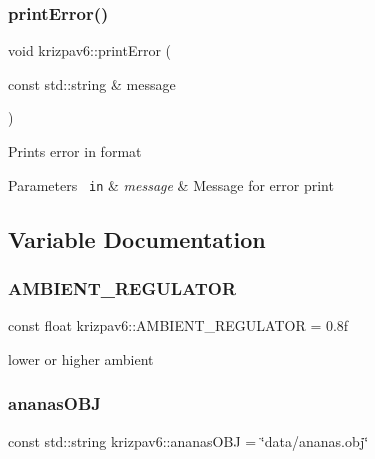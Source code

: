 \mbox{\label{namespacekrizpav6_a90d5cfc723ed2f9805870e7a0b6587cf}} 
\subsubsection{\texorpdfstring{printError()}{printError()}}
{\footnotesize\ttfamily void krizpav6\+::print\+Error (\begin{DoxyParamCaption}\item[{const std\+::string \&}]{message }\end{DoxyParamCaption})}

Prints error in format 
\begin{DoxyParams}[1]{Parameters}
\mbox{\texttt{ in}}  & {\em message} & Message for error print \\
\hline
\end{DoxyParams}


\subsection{Variable Documentation}
\mbox{\label{namespacekrizpav6_afb15791f5e8e6465d001c4f31b465bb5}} 
\subsubsection{\texorpdfstring{AMBIENT\_REGULATOR}{AMBIENT\_REGULATOR}}
{\footnotesize\ttfamily const float krizpav6\+::\+A\+M\+B\+I\+E\+N\+T\+\_\+\+R\+E\+G\+U\+L\+A\+T\+OR = 0.\+8f}



lower or higher ambient 

\mbox{\label{namespacekrizpav6_a6cd2a4963dfe1413e1289e6b093c605e}} 
\subsubsection{\texorpdfstring{ananasOBJ}{ananasOBJ}}
{\footnotesize\ttfamily const std\+::string krizpav6\+::ananas\+O\+BJ = \char`\"{}data/ananas.\+obj\char`\"{}}

